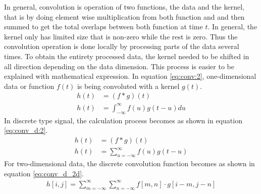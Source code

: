     In general, convolution is operation of two functions, the data and
    the kernel, that is by doing element wise multiplication from both function and
    and then summed to get the total
    overlaps between both function at time $t$. In general, the kernel
    only has limited size that is non-zero while the rest is
    zero. Thus the convolution operation is done locally by processing
    parts of the data several times. To obtain the entirety processed
    data, the kernel needed to be shifted in all direction depending
    on the data dimension. This process is easier to be explained with
    mathematical expression. In equation \ref{eq:conv:2},
    one-dimensional data or function $f(t)$ is being convoluted with a
    kernel $g(t)$.
    \begin{align}
        \label{eq:conv:1}
        h(t) &= (f * g)(t)\\
        \label{eq:conv:2}
        h(t) &= \int_{-\infty}^\infty f(u)g(t-u) du
    \end{align}
    In discrete type signal, the calculation process becomes as
    shown in equation \ref{eq:conv_d:2}.
    \begin{align}
        \label{eq:conv_d:1}
        h(t) &= (f * g)(t)\\
        \label{eq:conv_d:2}
        h(t) &= \sum_{u = -\infty}^{\infty} f(u)g(t-u)
    \end{align}
    For two-dimensional data, the discrete convolution function
    becomes as shown in equation \ref{eq:conv_d_2d}.
    \begin{align}
        \label{eq:conv_d_2d}
        h[i, j] = \sum_{m = -\infty}^{\infty}\sum_{n = -\infty}^{\infty}f[m, n]\cdot g[i-m, j-n]
    \end{align}

